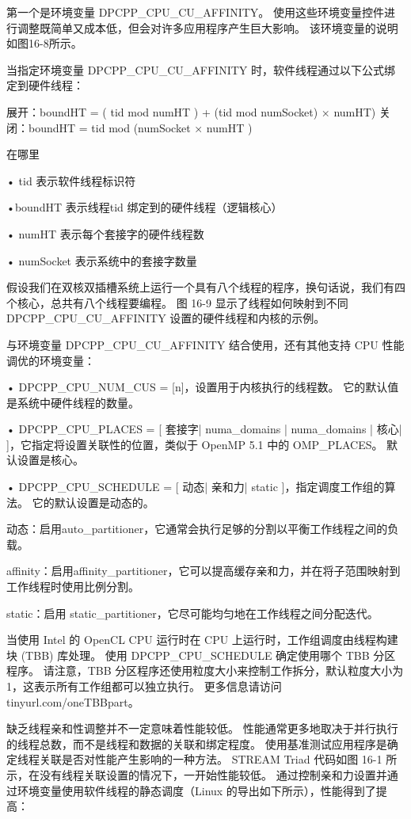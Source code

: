 第一个是环境变量 DPCPP\_CPU\_CU\_AFFINITY。 使用这些环境变量控件进行调整既简单又成本低，但会对许多应用程序产生巨大影响。 该环境变量的说明如图16-8所示。

当指定环境变量 DPCPP\_CPU\_CU\_AFFINITY 时，软件线程通过以下公式绑定到硬件线程：

展开：boundHT = ( tid mod numHT ) + (tid mod numSocket) × numHT) 关闭：boundHT = tid mod (numSocket × numHT )

在哪里

• tid 表示软件线程标识符

•boundHT 表示线程tid 绑定到的硬件线程（逻辑核心）

• numHT 表示每个套接字的硬件线程数

• numSocket 表示系统中的套接字数量

假设我们在双核双插槽系统上运行一个具有八个线程的程序，换句话说，我们有四个核心，总共有八个线程要编程。 图 16-9 显示了线程如何映射到不同 DPCPP\_CPU\_CU\_AFFINITY 设置的硬件线程和内核的示例。

与环境变量 DPCPP\_CPU\_CU\_AFFINITY 结合使用，还有其他支持 CPU 性能调优的环境变量：

• DPCPP\_CPU\_NUM\_CUS = [n]，设置用于内核执行的线程数。 它的默认值是系统中硬件线程的数量。

• DPCPP\_CPU\_PLACES = [ 套接字| numa\_domains | numa\_domains | 核心| ]，它指定将设置关联性的位置，类似于 OpenMP 5.1 中的 OMP\_PLACES。 默认设置是核心。

• DPCPP\_CPU\_SCHEDULE = [ 动态| 亲和力| static ]，指定调度工作组的算法。 它的默认设置是动态的。

动态：启用auto\_partitioner，它通常会执行足够的分割以平衡工作线程之间的负载。

affinity：启用affinity\_partitioner，它可以提高缓存亲和力，并在将子范围映射到工作线程时使用比例分割。

static：启用 static\_partitioner，它尽可能均匀地在工作线程之间分配迭代。

当使用 Intel 的 OpenCL CPU 运行时在 CPU 上运行时，工作组调度由线程构建块 (TBB) 库处理。 使用 DPCPP\_CPU\_SCHEDULE 确定使用哪个 TBB 分区程序。 请注意，TBB 分区程序还使用粒度大小来控制工作拆分，默认粒度大小为 1，这表示所有工作组都可以独立执行。 更多信息请访问tinyurl.com/oneTBBpart。

缺乏线程亲和性调整并不一定意味着性能较低。 性能通常更多地取决于并行执行的线程总数，而不是线程和数据的关联和绑定程度。 使用基准测试应用程序是确定线程关联是否对性能产生影响的一种方法。 STREAM Triad 代码如图 16-1 所示，在没有线程关联设置的情况下，一开始性能较低。 通过控制亲和力设置并通过环境变量使用软件线程的静态调度（Linux 的导出如下所示），性能得到了提高：


